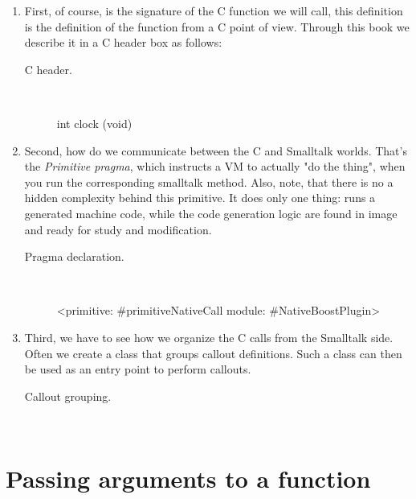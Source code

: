 \documentclass[a4paper,10pt,twoside]{book}
\begin{document}
\begin{enumerate}

\item First, of course, is the signature of the C function we will call, this definition is the definition of the function from a C point of view. Through this book we describe it in a C header box as follows:

\begin{description}
\item [C header.] \ 

\begin{code}{}
int clock (void)
\end{code}
\end{description}


\item Second, how do we communicate between the C and Smalltalk worlds. That's the \emph{Primitive pragma}, which instructs a VM to actually "do the thing", when you run the corresponding smalltalk method. Also, note, that there is no a hidden complexity behind this primitive. It does only one thing: runs a generated machine code, while the code generation logic are found in image and ready for study and modification.

\begin{description}
\item [Pragma declaration.] \ 

\begin{code}{}
	<primitive: #primitiveNativeCall module: #NativeBoostPlugin>
\end{code}

\end{description}

\item Third, we have to see how we organize the C calls from the Smalltalk side. Often we create a class that groups callout definitions. Such a class can then be used as an entry point to perform callouts.

\begin{description}
\item [Callout grouping.] \

\end{description}

\end{enumerate}

\section{Passing arguments to a function}
\end{document}
